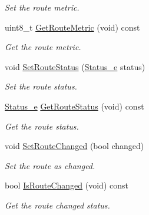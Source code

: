 \begin{DoxyCompactItemize}
\begin{DoxyCompactList}\small\item\em Set the route metric. \end{DoxyCompactList}\item 
uint8\+\_\+t \hyperlink{classns3_1_1RipNgRoutingTableEntry_a33743505b50f7746f656deee4f20d8ab}{Get\+Route\+Metric} (void) const 
\begin{DoxyCompactList}\small\item\em Get the route metric. \end{DoxyCompactList}\item 
void \hyperlink{classns3_1_1RipNgRoutingTableEntry_affacfc33b16857b44b03ba9352fd214b}{Set\+Route\+Status} (\hyperlink{classns3_1_1RipNgRoutingTableEntry_af723fc23e97afdd05c55da5162b7e673}{Status\+\_\+e} status)
\begin{DoxyCompactList}\small\item\em Set the route status. \end{DoxyCompactList}\item 
\hyperlink{classns3_1_1RipNgRoutingTableEntry_af723fc23e97afdd05c55da5162b7e673}{Status\+\_\+e} \hyperlink{classns3_1_1RipNgRoutingTableEntry_aa33f251505db372e0baa6dcedacb1d30}{Get\+Route\+Status} (void) const 
\begin{DoxyCompactList}\small\item\em Get the route status. \end{DoxyCompactList}\item 
void \hyperlink{classns3_1_1RipNgRoutingTableEntry_adc76e692e8dcf59a417c24cc18ccff09}{Set\+Route\+Changed} (bool changed)
\begin{DoxyCompactList}\small\item\em Set the route as changed. \end{DoxyCompactList}\item 
bool \hyperlink{classns3_1_1RipNgRoutingTableEntry_ac2ae5e35c8c528d5f686519ed9c6a891}{Is\+Route\+Changed} (void) const 
\begin{DoxyCompactList}\small\item\em Get the route changed status. \end{DoxyCompactList}\end{DoxyCompactItemize}
